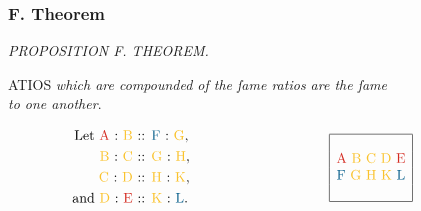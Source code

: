 \documentclass[11pt,preview]{standalone}
\begin{document}
\newcommand{\redA}{{\color{cred}{A}}}
\newcommand{\redE}{{\color{cred}{E}}}

\newcommand{\blueF}{{\color{cblue}{F}}}
\newcommand{\blueL}{{\color{cblue}{L}}}

\newcommand{\yellowB}{{\color{cyellow}{B}}}
\newcommand{\yellowC}{{\color{cyellow}{C}}}
\newcommand{\yellowD}{{\color{cyellow}{D}}}
\newcommand{\yellowG}{{\color{cyellow}{G}}}
\newcommand{\yellowH}{{\color{cyellow}{H}}}
\newcommand{\yellowK}{{\color{cyellow}{K}}}

\subsubsection{F. Theorem}

\begin{minipage}{\textwidth}
    \begin{center}
        \textit{PROPOSITION F. THEOREM.}\label{book5prF} \\
    \end{center}

    \hfill

    \begin{center}
        \raggedright \lettrine[lines=3, loversize=1, nindent=0pt]{}{}ATIOS \textit{which are compounded of the ſame ratios are the ſame\\ to one another}.
    \end{center}
\end{minipage}

\hfill

\hfill

$\begin{array}{c c}
        \qquad \qquad \begin{aligned}\text{Let \redA\ : \yellowB\ } & \text{:: \blueF\ : \yellowG},   \\
               \text{\yellowB\ : \yellowC\ }  & \text{:: \yellowG\ : \yellowH}, \\
               \text{\yellowC\ : \yellowD\ }  & \text{:: \yellowH\ : \yellowK}, \\
               \text{and \yellowD\ : \redE\ } & \text{:: \yellowK\ : \blueL}.   \\
                      \end{aligned} \qquad \qquad \qquad \qquad \qquad
        \begin{array}{|c|} \hline\\ \text{\redA}\ \text{\yellowB}\ \text{\yellowC}\ \text{\yellowD}\ \text{\redE} \\ \text{\blueF}\ \text{\yellowG}\ \text{\yellowH}\ \text{\yellowK}\ \text{\blueL} \\ \\ \hline \end{array}
    \end{array}$
\end{document}
